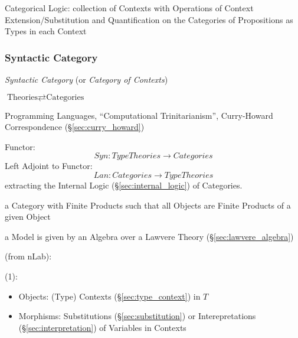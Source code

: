 Categorical Logic: collection of Contexts with Operations of Context
Extension/Substitution and Quantification on the Categories of
Propositions as Types in each Context



\subsubsection{Syntactic Category}\label{sec:syntactic_category}

\emph{Syntactic Category} (or \emph{Category of Contexts})

$\text{Theories} \rightleftarrows \text{Categories}$

Programming Languages, ``Computational Trinitarianism'', Curry-Howard
Correspondence (\S\ref{sec:curry_howard})

Functor:
\[
  Syn : TypeTheories \rightarrow Categories
\]
Left Adjoint to Functor:
\[
  Lan : Categories \rightarrow TypeTheories
\]
extracting the Internal Logic (\S\ref{sec:internal_logic}) of
Categories.

a Category with Finite Products such
that all Objects are Finite Products of a given Object %

a Model is given by an Algebra over a Lawvere Theory
(\S\ref{sec:lawvere_algebra})


(from nLab):

(1):

\begin{itemize}
  \item Objects: (Type) Contexts (\S\ref{sec:type_context}) in $T$
  \item Morphisms: Substitutions (\S\ref{sec:substitution}) or
    Interepretations (\S\ref{sec:interpretation}) of Variables in
    Contexts
\end{itemize}

